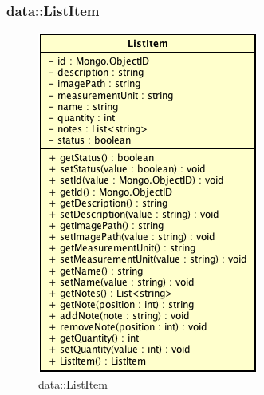 \subsubsection{data::ListItem}

\label{data::ListItem}
\begin{figure}[H]
	\centering
	\includegraphics[scale=0.5]{Sezioni/SottosezioniST/img/app/ListItem.png}
	\caption{data::ListItem}
\end{figure}


